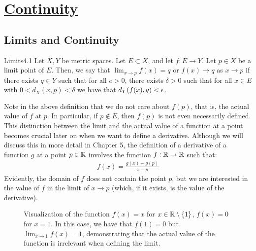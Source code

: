 \newpage 
\section[Continuity]{\hyperlink{toc}{Continuity}}

\subsection{Limits and Continuity}
\begin{definition}{Limits}{4.1}
    Let $X, Y$ be metric spaces. Let $E \subset X$, and let $f: E \rightarrow Y$. Let $p \in X$ be a limit point of $E$. Then, we say that $\lim_{x\rightarrow p} f(x) = q$ or $f(x) \rightarrow q$ as $x \rightarrow p$ if there exists $q \in Y$ such that for all $e > 0$, there exists $\delta > 0$ such that for all $x \in E$ with $0 < d_X(x, p) < \delta$ we have that $d_Y(f(x), q) < \epsilon$. 
\end{definition}
\noindent Note in the above definition that we do not care about $f(p)$, that is, the actual value of $f$ at $p$. In particular, if $p \notin E$, then $f(p)$ is not even necessarily defined. This distinction between the limit and the actual value of a function at a point becomes crucial later on when we want to define a derivative. Although we will discuss this in more detail in Chapter 5, the definition of a derivative of a function $g$ at a point $p \in \mathbb{R}$ involves the function $f: \mathbb{R} \rightarrow \mathbb{R}$ such that:
\begin{align*}
    f(x) = \frac{g(x) - g(p)}{x - p}
\end{align*}
Evidently, the domain of $f$ does not contain the point $p$, but we are interested in the value of $f$ in the limit of $x \rightarrow p$ (which, if it exists, is the value of the derivative).

\begin{figure}[htbp]
    \centering
    
    \caption{Visualization of the function $f(x) = x$ for $x \in \mathbb{R} \setminus \set{1}$, $f(x) = 0$ for $x = 1$. In this case, we have that $f(1) = 0$ but $\lim_{x \rightarrow 1} f(x) = 1$, demonstrating that the actual value of the function is irrelevant when defining the limit.}
    \label{fig17}
\end{figure}

